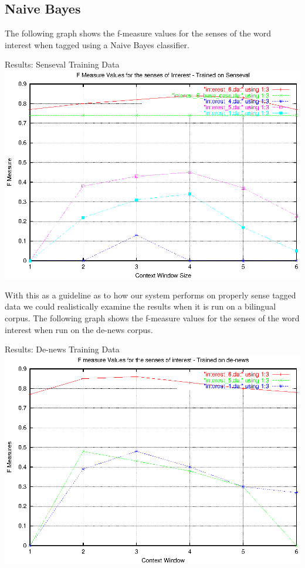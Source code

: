 \documentclass[a4wide,10pt]{article}
\begin{document}
\subsection{Naive Bayes}
\label{res_naivebayes}
The following graph shows the f-measure values for the senses
of the word interest when tagged using a Naive Bayes classifier.
\begin{center}
\Large{Results: Senseval Training Data}
\includegraphics{interest_nb.eps}
\end{center}

With this as a guideline as to how our system performs on properly sense
tagged data we could realistically examine the results when it is run on
a bilingual corpus.
The following graph shows the f-measure values for the senses of the word
interest when run on the de-news corpus.

\begin{center}
\Large{Results: De-news Training Data}
\includegraphics{interest_nb_de.eps}
\end{center}
\end{document}
